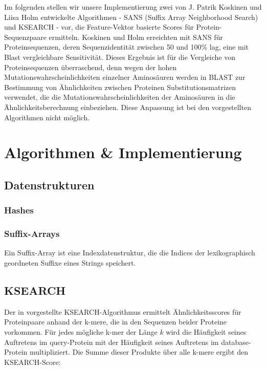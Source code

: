 \documentclass{article}
\begin{document}
Im folgenden stellen wir unsere Implementierung zwei von J. Patrik Koskinen und Liisa Holm entwickelte Algorithmen - SANS (Suffix Array Neighborhood Search) und KSEARCH - vor, die Feature-Vektor basierte Scores für Protein-Sequenzpaare ermitteln. Koskinen und Holm erreichten mit SANS für Proteinsequenzen, deren Sequenzidentität zwischen 50 und 100\% lag, eine mit Blast vergleichbare Sensitivität. Dieses Ergebnis ist für die Vergleiche von Proteinsequenzen überraschend, denn wegen der hohen Mutationswahrscheinlichkeiten einzelner Aminosäuren werden in BLAST zur Bestimmung von Ähnlichkeiten zwischen Proteinen Substitutionsmatrizen verwendet, die die Mutationswahrscheinlichkeiten der Aminosäuren in die Ähnlichkeitsberechnung einbeziehen. 
Diese Anpassung ist bei den vorgestellten Algorithmen nicht möglich.


\section{Algorithmen \& Implementierung}

\subsection{Datenstrukturen}

\subsubsection{Hashes}%

\subsubsection{Suffix-Arrays}

Ein Suffix-Array ist eine Indexdatenstruktur, die die Indices der lexikographisch geordneten Suffixe eines Strings speichert. %

\subsection{KSEARCH}
\label{ksearch}

Der in \cite{Holm} vorgestellte KSEARCH-Algorithmus ermittelt Ähnlichkeitsscores für Proteinpaare anhand der k-mere, die in den Sequenzen beider Proteine vorkommen. Für jedes mögliche k-mer der Länge $k$ wird die Häufigkeit seines Auftretens im query-Protein mit der Häufigkeit seines Auftretens im database-Protein multipliziert. Die Summe dieser Produkte über alle k-mere ergibt den KSEARCH-Score:
\end{document}
